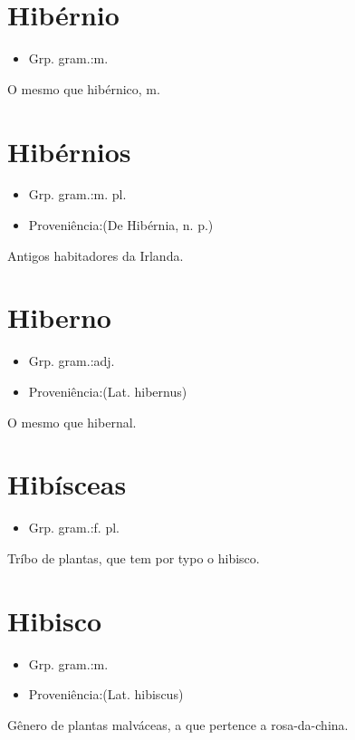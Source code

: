 \documentclass{article}
\begin{document}
\section{Hibérnio}
\begin{itemize}
\item {Grp. gram.:m.}
\end{itemize}
O mesmo que \textunderscore hibérnico\textunderscore , \textunderscore m.\textunderscore 
\section{Hibérnios}
\begin{itemize}
\item {Grp. gram.:m. pl.}
\end{itemize}
\begin{itemize}
\item {Proveniência:(De \textunderscore Hibérnia\textunderscore , n. p.)}
\end{itemize}
Antigos habitadores da Irlanda.
\section{Hiberno}
\begin{itemize}
\item {Grp. gram.:adj.}
\end{itemize}
\begin{itemize}
\item {Proveniência:(Lat. \textunderscore hibernus\textunderscore )}
\end{itemize}
O mesmo que \textunderscore hibernal\textunderscore .
\section{Hibísceas}
\begin{itemize}
\item {Grp. gram.:f. pl.}
\end{itemize}
Tríbo de plantas, que tem por typo o hibisco.
\section{Hibisco}
\begin{itemize}
\item {Grp. gram.:m.}
\end{itemize}
\begin{itemize}
\item {Proveniência:(Lat. \textunderscore hibiscus\textunderscore )}
\end{itemize}
Gênero de plantas malváceas, a que pertence a rosa-da-china.
\end{document}
